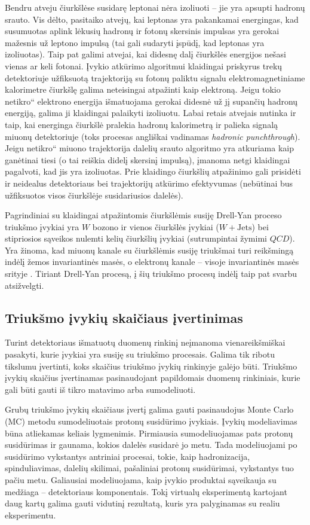 \documentclass[a4paper, 12pt, oneside]{article}
\newcommand{\WJets}{W\! +\!\mathrm{Jets}}
\newcommand{\ltq}[1]{{\quotedblbase{}#1\textquotedblleft{}}}
\newcommand{\QCD}{QC\! D}
\newlength\q
\begin{document}
Bendru atveju čiurkšlėse susidarę leptonai nėra izoliuoti -- jie yra apsupti hadronų srauto.
Vis dėlto, pasitaiko atvejų, kai leptonas yra pakankamai energingas, kad susumuotas aplink lėkusių hadronų ir fotonų
skersinis impulsas yra gerokai mažesnis už leptono impulsą (tai gali sudaryti įspūdį, kad leptonas yra izoliuotas).
Taip pat galimi atvejai, kai didesnę dalį čiurkšlės energijos nešasi vienas ar keli fotonai.
Įvykio atkūrimo algoritmui klaidingai priskyrus trekų detektoriuje užfiksuotą trajektoriją su fotonų paliktu signalu
elektromagnetiniame kalorimetre čiurkšlę galima neteisingai atpažinti kaip elektroną.
Jeigu tokio \ltq{netikro} elektrono energija išmatuojama gerokai didesnė už jį supančių hadronų energiją, galima ji
klaidingai palaikyti izoliuotu.
Labai retais atvejais nutinka ir taip, kai energinga čiurkšlė pralekia hadronų kalorimetrą ir palieka signalą miuonų
detektoriuje (toks procesas angliškai vadinamas \textit{hadronic punchthrough}).
Jeigu \ltq{netikro} miuono trajektorija dalelių srauto algoritmo yra atkuriama kaip ganėtinai tiesi (o tai reiškia
didelį skersinį impulsą), įmanoma netgi klaidingai pagalvoti, kad jis yra izoliuotas.
Prie klaidingo čiurkšlių atpažinimo gali prisidėti ir neidealus detektoriaus bei trajektorijų atkūrimo efektyvumas
(nebūtinai bus užfiksuotos visos čiurkšlėje susidariusios dalelės).

Pagrindiniai su klaidingai atpažintomis čiurkšlėmis susiję Drell-Yan proceso triukšmo įvykiai yra $W$ bozono ir vienos čiurkšlės
įvykiai ($\WJets$) bei stipriosios sąveikos nulemti kelių čiurkšlių įvykiai (sutrumpintai žymimi $\QCD$).
Yra žinoma, kad miuonų kanale su čiurkšlėmis susiję triukšmai turi reikšmingą indėlį žemos invariantinės masės,
o elektronų kanale -- visoje invariantinės masės srityje \cite{DY_CMS2011, DY_CMS2013, DY_CMS2015, DY_CMS2019}.
Tiriant Drell-Yan procesą, į šių triukšmo procesų indėlį taip pat svarbu atsižvelgti.

\subsection{Triukšmo įvykių skaičiaus įvertinimas}
Turint detektoriaus išmatuotų duomenų rinkinį neįmanoma vienareikšmiškai pasakyti, kurie įvykiai yra susiję su triukšmo
procesais.
Galima tik ribotu tikslumu įvertinti, koks skaičius triukšmo įvykių rinkinyje galėjo būti.
Triukšmo įvykių skaičius įvertinamas pasinaudojant papildomais duomenų rinkiniais, kurie gali būti gauti iš tikro matavimo
arba sumodeliuoti.

Grubų triukšmo įvykių skaičiaus įvertį galima gauti pasinaudojus Monte Carlo (MC) metodu sumodeliuotais protonų susidūrimo įvykiais.
Įvykių modeliavimas būna atliekamas keliais lygmenimis.
Pirmiausia sumodeliuojamas pats protonų susidūrimas ir gaunama, kokios dalelės susidarė jo metu.
Tada modeliuojami po susidūrimo vykstantys antriniai procesai, tokie, kaip hadronizacija, spinduliavimas, dalelių skilimai,
pašaliniai protonų susidūrimai, vykstantys tuo pačiu metu.
Galiausiai modeliuojama, kaip įvykio produktai sąveikauja su medžiaga -- detektoriaus komponentais.
Tokį virtualų eksperimentą kartojant daug kartų galima gauti vidutinį rezultatą, kuris yra palyginamas su realiu eksperimentu.
\end{document}
